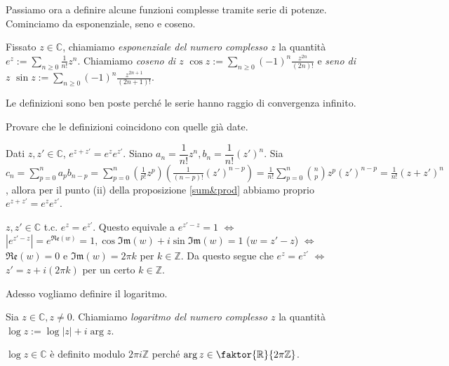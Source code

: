 Passiamo ora a definire alcune funzioni complesse tramite serie di potenze. Cominciamo da esponenziale, seno e coseno.

\begin{defn}
  Fissato $z \in \mathbb{C}$, chiamiamo \textit{esponenziale del numero complesso $z$} la quantità $\displaystyle e^z:=\sum_{n \ge 0} \frac{1}{n!}z^n$.
  Chiamiamo \textit{coseno di $z$} $\displaystyle \cos{z}:=\sum_{n \ge 0}(-1)^n\frac{z^{2n}}{(2n)!}$ e \textit{seno di $z$} $\displaystyle \sin{z}:=\sum_{n \ge 0}(-1)^n \frac{z^{2n+1}}{(2n+1)!}$.
\end{defn}

\begin{oss}
  Le definizioni sono ben poste perché le serie hanno raggio di convergenza infinito.
\end{oss}

\begin{exc}
  Provare che le definizioni coincidono con quelle già date.
\end{exc}

\begin{ex}
  Dati $z, z' \in \mathbb{C}$, $e^{z+z'}=e^ze^{z'}$. Siano $a_n=\dfrac{1}{n!}z^n, b_n=\dfrac{1}{n!}(z')^n$.
  Sia $\displaystyle c_n=\sum_{p=0}^n a_pb_{n-p}=\sum_{p=0}^n \left(\frac{1}{p!}z^p\right)\left(\frac{1}{(n-p)!}(z')^{n-p}\right)=\frac{1}{n!}\sum_{p=0}^n\binom{n}{p}z^p(z')^{n-p}=\frac{1}{n!}(z+z')^n$,
  allora per il punto (ii) della proposizione \ref{sum&prod} abbiamo proprio $e^{z+z'}=e^ze^{z'}$.
\end{ex}

\begin{oss}
  $z, z' \in \mathbb{C}$ t.c. $e^z=e^{z'}$. Questo equivale a $e^{z'-z}=1$ $\iff$ $|e^{z'-z}|=e^{\mathfrak{Re}(w)}=1, \cos{\mathfrak{Im}(w)}+i\sin{\mathfrak{Im}(w)}=1$ ($w=z'-z$) $\iff$ $\mathfrak{Re}(w)=0$ e $\mathfrak{Im}(w)=2\pi k$ per $k \in \mathbb{Z}$.
  Da questo segue che $e^z=e^{z'}$ $\iff$ $z'=z+i(2\pi k)$ per un certo $k \in \mathbb{Z}$.
\end{oss}

Adesso vogliamo definire il logaritmo.

\begin{defn}
  Sia $z \in \mathbb{C}, z \not=0$. Chiamiamo \textit{logaritmo del numero complesso $z$} la quantità $\log{z}:=\log{|z|}+i\arg{z}$.
\end{defn}

\begin{oss}
  $\log{z} \in \mathbb{C}$ è definito modulo $2\pi i \mathbb{Z}$ perché $\arg{z} \in \faktor{\mathbb{R}}{2\pi \mathbb{Z}}$.
\end{oss}

